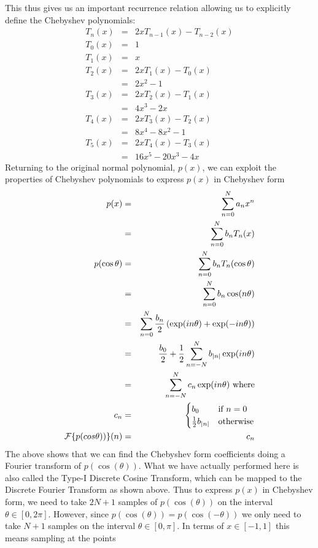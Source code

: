 \documentclass{article}
\DeclarePairedDelimiter\abs{\lvert}{\rvert}%
\begin{document}
This thus gives us an important recurrence relation allowing us to explicitly define the Chebyshev polynomials:
\begin{eqnarray}
    T_n(x) & = & 2 x T_{n-1}(x) - T_{n-2}(x) \\
    T_0(x) & = & 1 \\
    T_1(x) & = & x \\
    T_2(x) & = & 2xT_1(x) - T_0(x) \\
           & = & 2x^2 - 1 \\
    T_3(x) & = & 2xT_2(x) - T_1(x) \\
           & = & 4x^3-2x \\
    T_4(x) & = & 2xT_3(x) - T_2(x) \\
           & = & 8x^4-8x^2-1 \\
    T_5(x) & = & 2xT_4(x) - T_3(x) \\
           & = & 16x^5 -20x^3 -4x
\end{eqnarray}
Returning to the original normal polynomial, $ p(x) $, we can exploit the properties of Chebyshev polynomials to express $ p(x) $ in Chebyshev form
\begin{eqnarray}
    p(x) & = & \sum_{n=0}^N a_n x^n \\
         & = & \sum_{n=0}^N b_n T_n(x) \\
    p(\cos\theta) & = & \sum_{n=0}^N b_n T_n(\cos \theta) \\
                  & = & \sum_{n=0}^N b_n \cos(n\theta) \\
                  & = & \sum_{n=0}^N \frac{b_n}{2} \left( \exp(in\theta) + \exp(-in\theta) \right) \\
                  & = & \frac{b_0}{2} + \frac{1}{2} \sum_{n=-N}^N b_{\abs n} \exp(in\theta) \\
                  & = & \sum_{n=-N}^N c_n \exp(in\theta) \mbox{ where} \\
           c_n    & = &      
           \begin{cases}
               b_0  & \mbox{if } n = 0 \\
               \frac{1}{2} b_{\abs n}  & \mbox{otherwise}
           \end{cases} \\
           \mathcal{F}\{p(cos\theta))\}(n) & = & c_n
\end{eqnarray}
The above shows that we can find the Chebyshev form coefficients doing a Fourier transform of $ p(\cos(\theta)) $. What we have actually performed here is also called the Type-I Discrete Cosine Transform, which can be mapped to the Discrete Fourier Transform as shown above. Thus to express $ p(x) $ in Chebyshev form, we need to take $ 2N+1 $ samples of $ p(\cos(\theta)) $ on the interval $ \theta \in [0,2\pi] $. However, since $ p(\cos(\theta)) = p(\cos(-\theta)) $ we only need to take $ N+1 $ samples on the interval $ \theta \in [0,\pi] $. In terms of $ x \in [-1,1] $ this means sampling at the points
\end{document}
